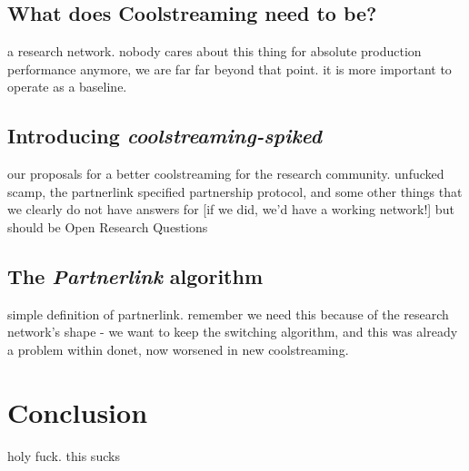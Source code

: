 \documentclass[12pt,a4paper]{article}
\begin{document}
\subsection{What does Coolstreaming need to be?}
a research network. nobody cares about this thing for absolute production performance anymore, we are far far beyond that point. it is more important to operate as a baseline.
\subsection{Introducing \textit{coolstreaming-spiked}}
our proposals for a better coolstreaming for the research community. unfucked scamp, the partnerlink specified partnership protocol, and some other things that we clearly do not have answers for [if we did, we'd have a working network!] but should be Open Research Questions
\subsection{The \textit{Partnerlink} algorithm}
simple definition of partnerlink. remember we need this because of the research network's shape - we want to keep the switching algorithm, and this was already a problem within donet, now worsened in new coolstreaming.
\section{Conclusion}
holy fuck. this sucks

\printbibliography
\end{document}
